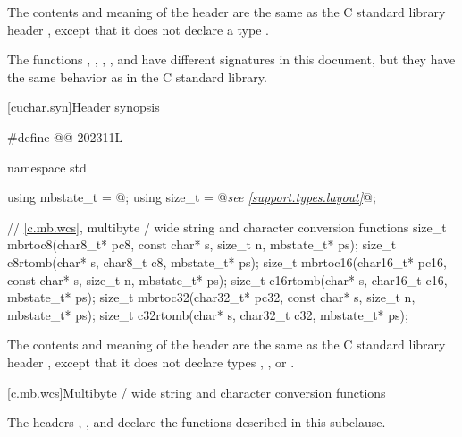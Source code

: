 \pnum
The contents and meaning of the header 
are the same as the C standard library header
, except that it does not declare a type .

\pnum
\begin{note}
The functions
, , , , and 
have different signatures in this document,
but they have the same behavior as in the C standard library.
\end{note}


[cuchar.syn]{Header  synopsis}

%
%
%
%
%
%
%
%
\begin{codeblock}
#define @@ 202311L

namespace std {
  using mbstate_t = @\seebelow@;
  using size_t = @\textit{see \ref{support.types.layout}}@;

  // \ref{c.mb.wcs}, multibyte / wide string and character conversion functions
  size_t mbrtoc8(char8_t* pc8, const char* s, size_t n, mbstate_t* ps);
  size_t c8rtomb(char* s, char8_t c8, mbstate_t* ps);
  size_t mbrtoc16(char16_t* pc16, const char* s, size_t n, mbstate_t* ps);
  size_t c16rtomb(char* s, char16_t c16, mbstate_t* ps);
  size_t mbrtoc32(char32_t* pc32, const char* s, size_t n, mbstate_t* ps);
  size_t c32rtomb(char* s, char32_t c32, mbstate_t* ps);
}
\end{codeblock}

\pnum
The contents and meaning of the header 
are the same as the C standard library header ,
except that it does not declare types
, , or .


[c.mb.wcs]{Multibyte / wide string and character conversion functions}

\pnum
\begin{note}
The headers ,
,
and 
declare the functions described in this subclause.
\end{note}

